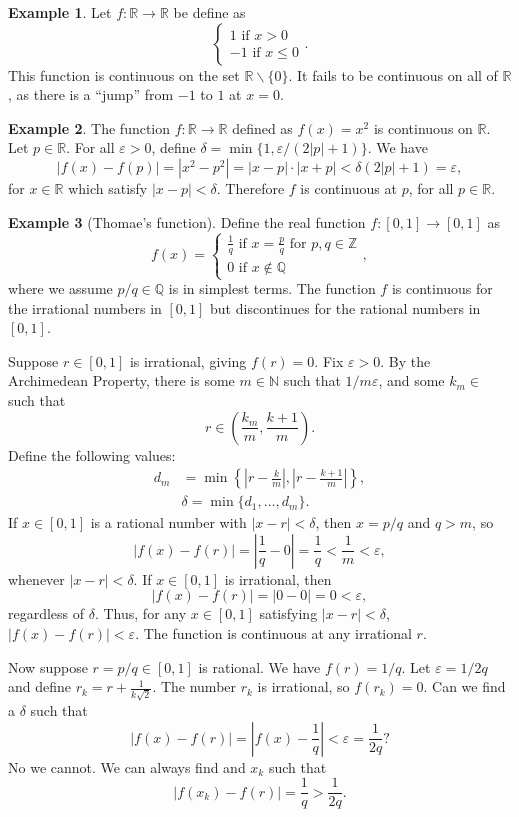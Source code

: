 \documentclass{article}
\newcommand{\N}{\mathbb{N}}
\newcommand{\R}{\mathbb{R}}
\newcommand{\Q}{\mathbb{Q}}
\newcommand{\Z}{\mathbb{Z}}
\theoremstyle{definition}
\newtheorem{example}{Example}[section]
\begin{document}
	\begin{example}
		Let $ f:\R\to\R $ be define as $$ \begin{cases}
			1\text{ if }x>0\\-1\text{ if }x\le0
		\end{cases} .$$
		This function is continuous on the set $ \R\backslash\{0\} $. It fails to be continuous on all of $ \R $, as there is a ``jump'' from $ -1 $ to $ 1 $ at $ x=0 $. 	
	\end{example}
	\begin{example}
		The function $ f:\R\to\R $ defined as $ f(x)=x^2 $ is continuous on $ \R $. Let $ p\in\R $. For all $ \varepsilon>0 $, define $ \delta=\min\{1,\varepsilon/(2|p|+1)\} $. We have $$|f(x)-f(p)|=|x^2-p^2|=|x-p|\cdot|x+p|<\delta(2|p|+1)=\varepsilon ,$$ for $ x\in \R $ which satisfy $ |x-p|<\delta $.  Therefore $ f $ is continuous at $ p $, for all $ p\in\R $. 
	\end{example}
	\begin{example}[Thomae's function]
		Define the real function $ f:[0,1]\to[0,1] $ as $$f(x)=\begin{cases}
			\frac{1}{q} \text{ if }x=\frac{p}{q}\text{ for }p,q\in\Z\\
			0\text{ if }x\notin\Q
		\end{cases} ,$$ where we assume $ p/q\in\Q $ is in simplest terms. The function $ f $ is continuous for the irrational numbers in $ [0,1] $ but discontinues for the rational numbers in $ [0,1] $. 
		
		Suppose $ r\in[0,1] $ is irrational, giving $ f(r)=0 $. Fix $ \varepsilon>0 $. By the Archimedean Property, there is some $ m\in\N $ such that $ 1/m \varepsilon$, and some $ k_m\in $ such that $$ r\in\left(\frac{k_m}{m},\frac{k+1}{m}\right) .$$ Define the following values:
		\begin{align*}
			d_m&=\min\left\{\left\lvert r-\frac{k}{m}\right\rvert,\left\lvert r-\frac{k+1}{m}\right\rvert\right\},\\
			&\delta=\min\{d_1,\ldots,d_m\}.
		\end{align*}
		If $ x\in[0,1] $ is a rational number with $ |x-r|<\delta $, then $ x=p/q $ and $ q>m $, so $$|f(x)-f(r)|=\left\lvert \frac{1}{q}-0\right\rvert=\frac{1}{q}<\frac{1}{m}<\varepsilon ,$$ whenever $ |x-r|<\delta $. If $ x\in[0,1] $ is irrational, then $$ |f(x)-f(r)|=|0-0|=0<\varepsilon ,$$ regardless of $ \delta $. Thus, for any $ x\in[0,1] $ satisfying $ |x-r|<\delta $, $ |f(x)-f(r)|<\varepsilon $. The function is continuous at any irrational $ r $.
		
		Now suppose $ r=p/q\in[0,1] $ is rational. We have $ f(r)=1/q $. Let $ \varepsilon=1/2q $ and define $ r_k=r+\frac{1}{k\sqrt{2}} $. The number $ r_k $ is irrational, so $ f(r_k)=0 $. Can we find a $ \delta $ such that $$ |f(x)-f(r)|=\left\lvert f(x)-\frac{1}{q}\right\rvert<\varepsilon=\frac{1}{2q}?$$ No we cannot. We can always find and $ x_k $ such that $$|f(x_k)-f(r)|=\frac{1}{q}>\frac{1}{2q}. $$  
	\end{example}
\end{document}
